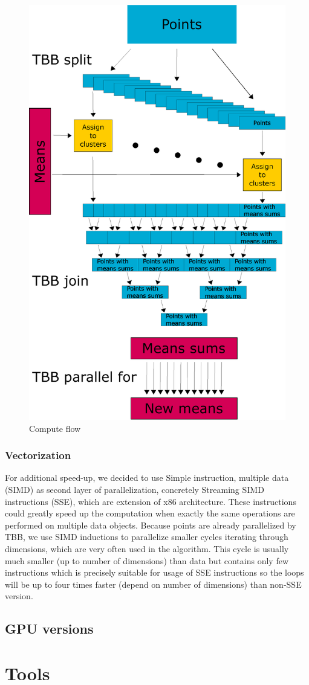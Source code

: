 \begin{figure}[h]
  \centering
  \includegraphics[width=1\linewidth]{img/computeFlow.eps}
  \caption{Compute flow}
  \label{fig:computeflow}
\end{figure}
\subsubsection{Vectorization}
For additional speed-up, we decided to use Simple instruction, multiple data (SIMD) as second layer of parallelization, concretely Streaming SIMD instructions (SSE), which are extension of x86 architecture. These instructions could greatly speed up the computation when exactly the same operations are performed on multiple data objects. Because points are already parallelized by TBB, we use SIMD inductions to parallelize smaller cycles iterating through dimensions, which are very often used in the algorithm. This cycle is usually much smaller (up to number of dimensions) than data but contains only few instructions which is precisely suitable for usage of SSE instructions so the loops will be up to four times faster (depend on number of dimensions) than non-SSE version.
\subsection{GPU versions}
\section{Tools}